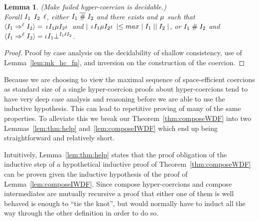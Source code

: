 \documentclass[acmtog, authorversion, acmlarge]{acmart}
\newtheorem{lem}{Lemma}
\begin{document}
\begin{lem}
  \label{lem:mk_hc_dec}
  (Make failed hyper-coercion is decidable.)\\
  Forall $I_1$ $I_2$ $\ell$,
  either $I_1 \; \overline{\#} \; I_2$ and there exists and $\mu$
  such that $\langle I_1 \Rightarrow^{\ell} I_2 \rangle = \, \iota_{} I_1 \mu I_2 \iota_{} \,$
  and $\mid \, \iota_{} I_1 \mu I_2 \iota_{} \, \mid
  \le max \mid I_1 \mid \mid I_2 \mid$,
  or $I_1 \; \# \; I_2$ and
  $\langle I_1 \Rightarrow^{\ell} I_2 \rangle = \iota_{} I_1 \bot^{I_1 \ell I_2}$.
\end{lem}
\begin{proof}
  Proof by case analysis on the decidability of shallow consistency,
  use of Lemma~\ref{lem:mk_hc_fn}, and inversion on the construction
  of the coercion. 
\end{proof}

Because we are choosing to view the maximal sequence of
space-efficient coercions as standard size of a single hyper-coercion
proofs about hyper-coercions tend to have very deep case analysis and
reasoning before we are able to use the inductive hypothesis. This can
lead to repetitive proving of many of the same properties. To
alleviate this we break our Theorem~\ref{thm:composeWDF} into two
Lemmas~\ref{lem:thm:help} and~\ref{lem:composeIWDF} which end up being straightforward and relatively short.

Intuitively, Lemma~\ref{lem:thm:help} states that the proof obligation
of the inductive step of a hypothetical inductive proof of
Theorem~\ref{thm:composeWDF} can be proven given the inductive
hypothesis of the proof of Lemma~\ref{lem:composeIWDF}. Since
compose hyper-coercions and compose intermediates are mutually
recursive a proof that either one of them is well behaved is
enough to ``tie the knot'', but would normally have to induct
all the way through the other definition in order to do so.
\end{document}
